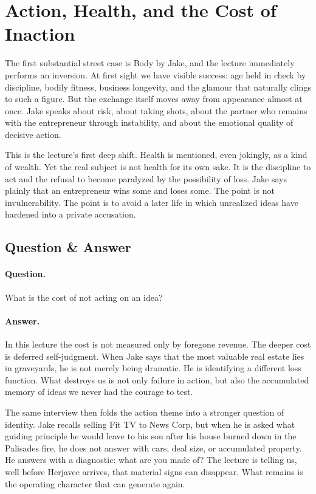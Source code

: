 \section{Action, Health, and the Cost of Inaction}

The first substantial street case is Body by Jake, and the lecture immediately performs an inversion. At first sight we have visible success: age held in check by discipline, bodily fitness, business longevity, and the glamour that naturally clings to such a figure. But the exchange itself moves away from appearance almost at once. Jake speaks about risk, about taking shots, about the partner who remains with the entrepreneur through instability, and about the emotional quality of decisive action.

This is the lecture's first deep shift. Health is mentioned, even jokingly, as a kind of wealth. Yet the real subject is not health for its own sake. It is the discipline to act and the refusal to become paralyzed by the possibility of loss. Jake says plainly that an entrepreneur wins some and loses some. The point is not invulnerability. The point is to avoid a later life in which unrealized ideas have hardened into a private accusation.

\subsection{Question \& Answer}

\paragraph{Question.} What is the cost of not acting on an idea?

\paragraph{Answer.} In this lecture the cost is not measured only by foregone revenue. The deeper cost is deferred self-judgment. When Jake says that the most valuable real estate lies in graveyards, he is not merely being dramatic. He is identifying a different loss function. What destroys us is not only failure in action, but also the accumulated memory of ideas we never had the courage to test.

The same interview then folds the action theme into a stronger question of identity. Jake recalls selling Fit TV to News Corp, but when he is asked what guiding principle he would leave to his son after his house burned down in the Palisades fire, he does not answer with cars, deal size, or accumulated property. He answers with a diagnostic: what are you made of? The lecture is telling us, well before Herjavec arrives, that material signs can disappear. What remains is the operating character that can generate again.

